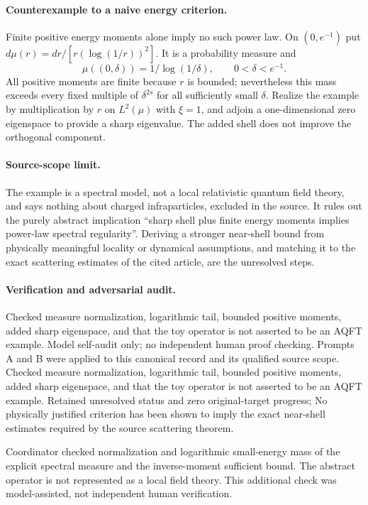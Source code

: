 \documentclass[11pt]{article}
\begin{document}
\paragraph{Counterexample to a naive energy criterion.} Finite positive energy moments alone imply no such power law. On $(0,e^{-1})$ put $d\mu(r)=dr/[r(\log(1/r))^2]$. It is a probability measure and
\[
 \mu((0,\delta))=1/\log(1/\delta),\qquad 0<\delta<e^{-1}.
\]
All positive moments are finite because $r$ is bounded; nevertheless this mass exceeds every fixed multiple of $\delta^{2s}$ for all sufficiently small $\delta$. Realize the example by multiplication by $r$ on $L^2(\mu)$ with $\xi=1$, and adjoin a one-dimensional zero eigenspace to provide a sharp eigenvalue. The added shell does not improve the orthogonal component.

\paragraph{Source-scope limit.} The example is a spectral model, not a local relativistic quantum field theory, and says nothing about charged infraparticles, excluded in the source. It rules out the purely abstract implication ``sharp shell plus finite energy moments implies power-law spectral regularity''. Deriving a stronger near-shell bound from physically meaningful locality or dynamical assumptions, and matching it to the exact scattering estimates of the cited article, are the unresolved steps.

\paragraph{Verification and adversarial audit.}
Checked measure normalization, logarithmic tail, bounded positive moments, added sharp eigenspace, and that the toy operator is not asserted to be an AQFT example. Model self-audit only; no independent human proof checking. Prompts A and B were applied to this canonical record and its qualified source scope. Checked measure normalization, logarithmic tail, bounded positive moments, added sharp eigenspace, and that the toy operator is not asserted to be an AQFT example. Retained unresolved status and zero original-target progress; No physically justified criterion has been shown to imply the exact near-shell estimates required by the source scattering theorem.

Coordinator checked normalization and logarithmic small-energy mass of the explicit spectral measure and the inverse-moment sufficient bound. The abstract operator is not represented as a local field theory. This additional check was model-assisted, not independent human verification.
\end{document}
